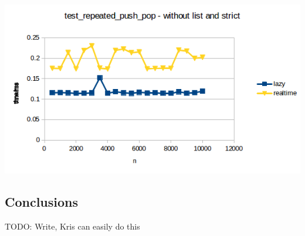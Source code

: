 \includegraphics{Graphs/test_repeated_push_pop_without_list.png}


\subsection{Conclusions}
 
 TODO: Write, Kris can easily do this